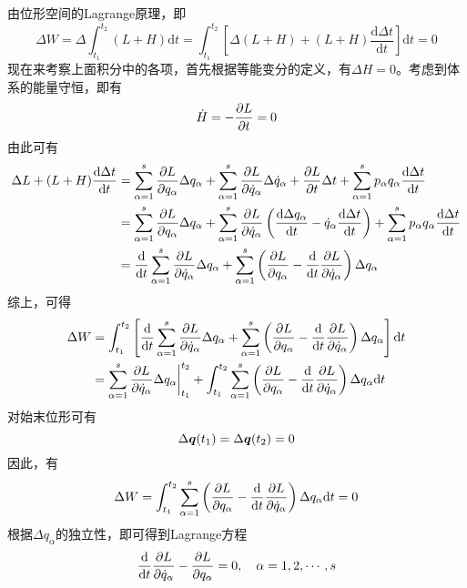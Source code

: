 \begin{example}[由位形空间的Lagrange原理导出Lagrange方程]
由位形空间的Lagrange原理，即
\begin{equation*}
	\Delta W = \Delta \int_{t_1}^{t_2} (L+H) \mathrm{d} t = \int_{t_1}^{t_2} \left[\Delta(L+H) + (L+H) \frac{\mathrm{d} \Delta t}{\mathrm{d} t}\right] \mathrm{d} t = 0
\end{equation*}
现在来考察上面积分中的各项，首先根据等能变分的定义，有$\Delta H = 0$。考虑到体系的能量守恒，即有
\begin{equation*}
	\dot{H} = -\frac{\partial L}{\partial t} = 0
\end{equation*}
由此可有
\begin{align*}
	\Delta L + (L+H) \frac{\mathrm{d} \Delta t}{\mathrm{d} t} & = \sum_{\alpha=1}^s \frac{\partial L}{\partial q_\alpha} \Delta q_\alpha + \sum_{\alpha=1}^s \frac{\partial L}{\partial \dot{q}_\alpha} \Delta \dot{q}_\alpha + \frac{\partial L}{\partial t} \Delta t + \sum_{\alpha=1}^s p_\alpha q_\alpha \frac{\mathrm{d} \Delta t}{\mathrm{d} t}\\
	& = \sum_{\alpha=1}^s \frac{\partial L}{\partial q_\alpha} \Delta q_\alpha + \sum_{\alpha=1}^s \frac{\partial L}{\partial \dot{q}_\alpha} \left(\frac{\mathrm{d} \Delta q_\alpha}{\mathrm{d} t} - \dot{q}_\alpha \frac{\mathrm{d} \Delta t}{\mathrm{d} t}\right) + \sum_{\alpha=1}^s p_\alpha q_\alpha \frac{\mathrm{d} \Delta t}{\mathrm{d} t}\\
	& = \frac{\mathrm{d}}{\mathrm{d} t} \sum_{\alpha=1}^s \frac{\partial L}{\partial \dot{q}_\alpha} \Delta q_\alpha + \sum_{\alpha=1}^s \left(\frac{\partial L}{\partial q_\alpha} - \frac{\mathrm{d}}{\mathrm{d} t} \frac{\partial L}{\partial \dot{q}_\alpha}\right) \Delta q_\alpha
\end{align*}
综上，可得
\begin{align*}
	\Delta W & = \int_{t_1}^{t_2} \left[\frac{\mathrm{d}}{\mathrm{d} t} \sum_{\alpha=1}^s \frac{\partial L}{\partial \dot{q}_\alpha} \Delta q_\alpha + \sum_{\alpha=1}^s \left(\frac{\partial L}{\partial q_\alpha} - \frac{\mathrm{d}}{\mathrm{d} t} \frac{\partial L}{\partial \dot{q}_\alpha}\right) \Delta q_\alpha\right] \mathrm{d} t \\
	& = \sum_{\alpha=1}^s \frac{\partial L}{\partial \dot{q}_\alpha} \Delta q_\alpha\bigg|_{t_1}^{t_2} + \int_{t_1}^{t_2} \sum_{\alpha=1}^s \left(\frac{\partial L}{\partial q_\alpha} - \frac{\mathrm{d}}{\mathrm{d} t} \frac{\partial L}{\partial \dot{q}_\alpha}\right) \Delta q_\alpha \mathrm{d} t
\end{align*}
对始末位形可有
\begin{equation*}
	\Delta \boldsymbol{q}(t_1) = \Delta \boldsymbol{q}(t_2) = 0
\end{equation*}
因此，有
\begin{equation*}
	\Delta W = \int_{t_1}^{t_2} \sum_{\alpha=1}^s \left(\frac{\partial L}{\partial q_\alpha} - \frac{\mathrm{d}}{\mathrm{d} t} \frac{\partial L}{\partial \dot{q}_\alpha}\right) \Delta q_\alpha \mathrm{d} t = 0
\end{equation*}
根据$\Delta q_\alpha$的独立性，即可得到Lagrange方程
\begin{equation*}
	\frac{\mathrm{d}}{\mathrm{d} t} \frac{\partial L}{\partial \dot{q}_\alpha} - \frac{\partial L}{\partial q_\alpha} = 0,\quad \alpha = 1,2,\cdots,s
\end{equation*}
\end{example}

